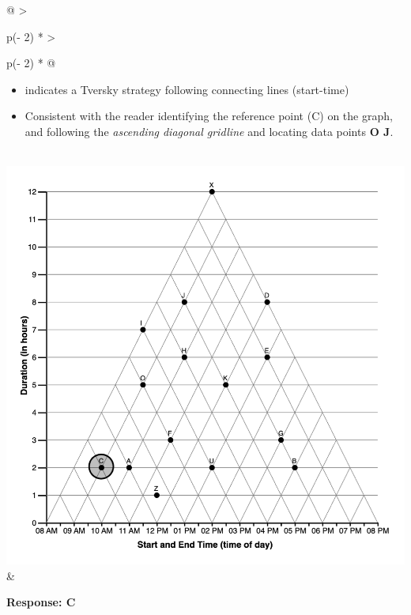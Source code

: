 \documentclass[
  letterpaper,
  DIV=11,
  numbers=noendperiod]{scrreprt}
\providecommand{\tightlist}{%
  \setlength{\itemsep}{0pt}\setlength{\parskip}{0pt}}\usepackage{longtable,booktabs,array}
\begin{document}
\begin{longtable}[]{@{}
  >{\raggedright\arraybackslash}p{(\columnwidth - 2\tabcolsep) * }
  >{\raggedright\arraybackslash}p{(\columnwidth - 2\tabcolsep) * }@{}}
\begin{minipage}[t]{\linewidth}
\begin{itemize}
\tightlist
\item
  indicates a Tversky strategy following connecting lines (start-time)
\item
  Consistent with the reader identifying the reference point (C) on the
  graph, and following the \emph{ascending diagonal gridline} and
  locating data points \textbf{O J}.
\end{itemize}
\end{minipage} \\
\includegraphics{analysis/SGC3A/static/interpretations/Q3_111_C.png} &
\begin{minipage}[t]{\linewidth}\raggedright
\textbf{Response: C}


\end{minipage}
\end{longtable}
\end{document}
